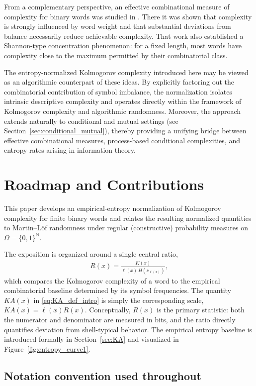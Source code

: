 \documentclass[12pt]{article}
\newcommand{\be}{\begin{eqnarray}}
\newcommand{\ee}{\end{eqnarray}}
\begin{document}
From a complementary perspective, an effective combinational measure of
complexity for binary words was studied in
\citet{StojanovicVidakovic1987}. There it was shown that complexity is strongly
influenced by word weight and that substantial deviations from balance
necessarily reduce achievable complexity. That work also established a
Shannon-type concentration phenomenon: for a fixed length, most words have
complexity close to the maximum permitted by their combinatorial class.

The entropy-normalized Kolmogorov complexity introduced here may be viewed as an
algorithmic counterpart of these ideas. By explicitly factoring out the
combinatorial contribution of symbol imbalance, the normalization isolates
intrinsic descriptive complexity and operates directly within the framework of
Kolmogorov complexity and algorithmic randomness. Moreover, the approach extends
naturally to conditional and mutual settings (see
Section~\ref{sec:conditional_mutual}), thereby providing a unifying bridge
between effective combinational measures, process-based conditional
complexities, and entropy rates arising in information theory.

\section{Roadmap and Contributions}
\label{sec:roadmap}

This paper develops an empirical-entropy normalization of Kolmogorov complexity
for finite binary words and relates the resulting normalized quantities to
Martin--L\"of randomness under regular (constructive) probability measures on
$\Omega=\{0,1\}^{\mathbb{N}}$.

The exposition is organized around a single central ratio,
\be
R(x)=\frac{K(x)}{\ell(x)\,H(\nu_{\ell(x)})},
\label{eq:R_def_roadmap}
\ee
which compares the Kolmogorov complexity of a word to the empirical
combinatorial baseline determined by its symbol frequencies. The quantity
$KA(x)$ in \eqref{eq:KA_def_intro} is simply the corresponding scale,
$KA(x)=\ell(x)R(x)$. Conceptually, $R(x)$ is the primary statistic: both the
numerator and denominator are measured in bits, and the ratio directly
quantifies deviation from shell-typical behavior. The empirical entropy
baseline is introduced formally in
Section~\ref{sec:KA} and visualized in
Figure~\ref{fig:entropy_curve1}.

\subsection*{Notation convention used throughout}
\label{sec:notation}
\end{document}
